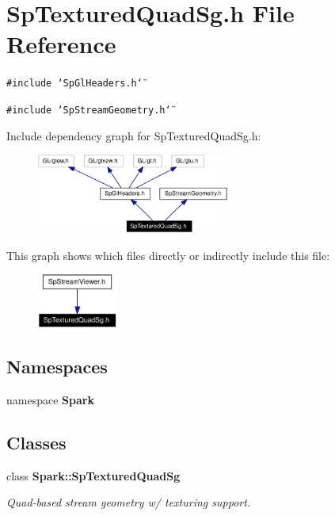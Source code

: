 \section{Sp\-Textured\-Quad\-Sg.h File Reference}
\label{SpTexturedQuadSg_8h}
{\tt \#include \char`\"{}Sp\-Gl\-Headers.h\char`\"{}}\par
{\tt \#include \char`\"{}Sp\-Stream\-Geometry.h\char`\"{}}\par


Include dependency graph for Sp\-Textured\-Quad\-Sg.h:\begin{figure}[H]
\begin{center}
\leavevmode
\includegraphics[width=179pt]{SpTexturedQuadSg_8h__incl}
\end{center}
\end{figure}


This graph shows which files directly or indirectly include this file:\begin{figure}[H]
\begin{center}
\leavevmode
\includegraphics[width=74pt]{SpTexturedQuadSg_8h__dep__incl}
\end{center}
\end{figure}
\subsection*{Namespaces}
\begin{CompactItemize}
\item 
namespace {\bf Spark}
\end{CompactItemize}
\subsection*{Classes}
\begin{CompactItemize}
\item 
class {\bf Spark::Sp\-Textured\-Quad\-Sg}
\begin{CompactList}\small\item\em Quad-based stream geometry w/ texturing support. \item\end{CompactList}\end{CompactItemize}
